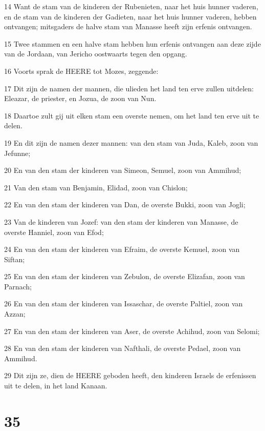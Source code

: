 \par 14 Want de stam van de kinderen der Rubenieten, naar het huis hunner vaderen, en de stam van de kinderen der Gadieten, naar het huis hunner vaderen, hebben ontvangen; mitsgaders de halve stam van Manasse heeft zijn erfenis ontvangen.
\par 15 Twee stammen en een halve stam hebben hun erfenis ontvangen aan deze zijde van de Jordaan, van Jericho oostwaarts tegen den opgang.
\par 16 Voorts sprak de HEERE tot Mozes, zeggende:
\par 17 Dit zijn de namen der mannen, die ulieden het land ten erve zullen uitdelen: Eleazar, de priester, en Jozua, de zoon van Nun.
\par 18 Daartoe zult gij uit elken stam een overste nemen, om het land ten erve uit te delen.
\par 19 En dit zijn de namen dezer mannen: van den stam van Juda, Kaleb, zoon van Jefunne;
\par 20 En van den stam der kinderen van Simeon, Semuel, zoon van Ammihud;
\par 21 Van den stam van Benjamin, Elidad, zoon van Chislon;
\par 22 En van den stam der kinderen van Dan, de overste Bukki, zoon van Jogli;
\par 23 Van de kinderen van Jozef: van den stam der kinderen van Manasse, de overste Hanniel, zoon van Efod;
\par 24 En van den stam der kinderen van Efraim, de overste Kemuel, zoon van Siftan;
\par 25 En van den stam der kinderen van Zebulon, de overste Elizafan, zoon van Parnach;
\par 26 En van den stam der kinderen van Issaschar, de overste Paltiel, zoon van Azzan;
\par 27 En van den stam der kinderen van Aser, de overste Achihud, zoon van Selomi;
\par 28 En van den stam der kinderen van Nafthali, de overste Pedael, zoon van Ammihud.
\par 29 Dit zijn ze, dien de HEERE geboden heeft, den kinderen Israels de erfenissen uit te delen, in het land Kanaan.

\chapter{35}

